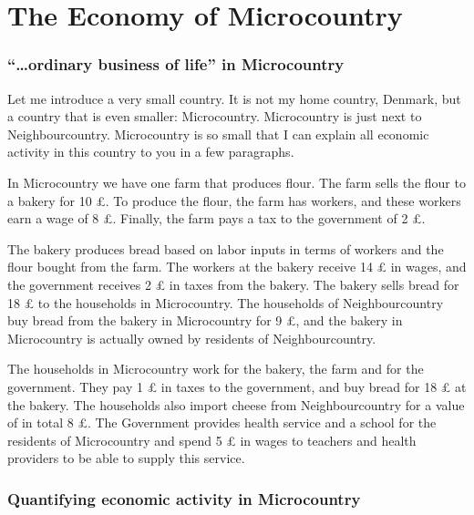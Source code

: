 \documentclass[
]{book}
\begin{document}
\hypertarget{the-economy-of-microcountry}{%
\section{The Economy of Microcountry}\label{the-economy-of-microcountry}}

\hypertarget{ordinary-business-of-life-in-microcountry}{%
\subsubsection*{``\ldots ordinary business of life'' in Microcountry}\label{ordinary-business-of-life-in-microcountry}}

Let me introduce a very small country. It is not my home country, Denmark, but a country that is even smaller: Microcountry. Microcountry is just next to Neighbourcountry. Microcountry is so small that I can explain all economic activity in this country to you in a few paragraphs.

In Microcountry we have one farm that produces flour. The farm sells the flour to a bakery for 10 £. To produce the flour, the farm has workers, and these workers earn a wage of 8 £. Finally, the farm pays a tax to the government of 2 £.

The bakery produces bread based on labor inputs in terms of workers and the flour bought from the farm. The workers at the bakery receive 14 £ in wages, and the government receives 2 £ in taxes from the bakery. The bakery sells bread for 18 £ to the households in Microcountry. The households of Neighbourcountry buy bread from the bakery in Microcountry for 9 £, and the bakery in Microcountry is actually owned by residents of Neighbourcountry.

The households in Microcountry work for the bakery, the farm and for the government. They pay 1 £ in taxes to the government, and buy bread for 18 £ at the bakery. The households also import cheese from Neighbourcountry for a value of in total 8 £. The Government provides health service and a school for the residents of Microcountry and spend 5 £ in wages to teachers and health providers to be able to supply this service.

\hypertarget{quantifying-economic-activity-in-microcountry}{%
\subsubsection*{Quantifying economic activity in Microcountry}\label{quantifying-economic-activity-in-microcountry}}
\end{document}
